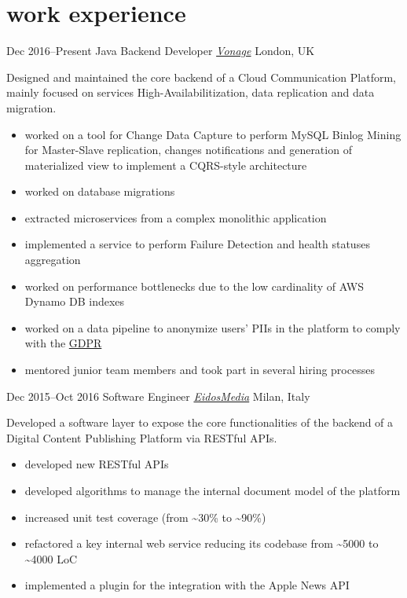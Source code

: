 \vspace{-.4cm}
\section{\normalfont work experience}

\begin{entrylist}
\entry
{Dec 2016--Present}
{Java Backend Developer {\normalfont \emph{\href{https://www.vonage.com/business/}{Vonage}}}}
{London, UK}
{Designed and maintained the core backend of a Cloud Communication Platform, mainly focused on services High-Availabilitization, data replication and data migration.
\vspace{-.2cm}
\begin{itemize}[leftmargin=.6cm]
	\item worked on a tool for Change Data Capture to perform MySQL Binlog Mining for Master-Slave replication, changes notifications and generation of materialized view to implement a CQRS-style architecture
	\item worked on database migrations
	\item extracted microservices from a complex monolithic application
	\item implemented a service to perform Failure Detection and health statuses aggregation
	\item worked on performance bottlenecks due to the low cardinality of AWS Dynamo DB indexes
	\item worked on a data pipeline to anonymize users' PIIs in the platform to comply with the \href{https://en.wikipedia.org/wiki/General_Data_Protection_Regulation}{GDPR}
	\item mentored junior team members and took part in several hiring processes
\end{itemize}
}

\entry
{Dec 2015--Oct 2016}
{Software Engineer {\normalfont \emph{\href{https://www.eidosmedia.com/}{EidosMedia}}}}
{Milan, Italy}
{Developed a software layer to expose the core functionalities of the backend of a Digital Content Publishing Platform via RESTful APIs.  
\vspace{-.2cm}
\begin{itemize}[leftmargin=.6cm] 
	\item developed new RESTful APIs  
	\item developed algorithms to manage the internal document model of the platform
	\item increased unit test coverage (from \textasciitilde 30\% to \textasciitilde 90\%)
	\item refactored a key internal web service reducing its codebase from \textasciitilde 5000 to \textasciitilde 4000 LoC
	\item implemented a plugin for the integration with the Apple News API 
\end{itemize}
}


\end{entrylist}
